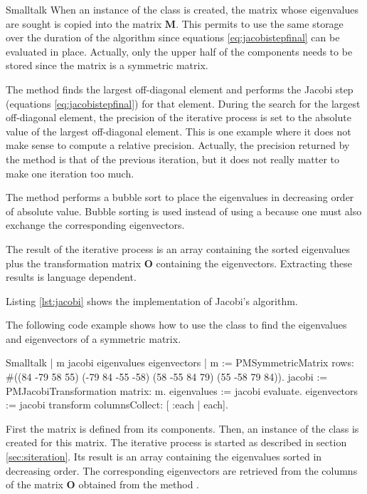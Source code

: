\begin{displaycode}{Smalltalk}
When an instance of the class  is created,
the matrix whose eigenvalues are sought is copied into the matrix
$\textbf{M}$.
This permits to use the same storage over the duration of the algorithm since equations \ref{eq:jacobistepfinal} can be evaluated in place.
Actually, only the upper half of the components needs to be stored since the matrix is a symmetric
matrix.

The method  finds the largest off-diagonal
element and performs the Jacobi step (equations
\ref{eq:jacobistepfinal}) for that element. During the search for
the largest off-diagonal element, the precision of the iterative
process is set to the absolute value of the largest off-diagonal
element. This is one example where it does not make sense to
compute a relative precision. Actually, the precision returned by
the method  is that of the previous
iteration, but it does not really matter to make one iteration too
much.

The method  performs a bubble sort to
place the eigenvalues in decreasing order of absolute value.
Bubble sorting is used instead of using a 
because one must also exchange the corresponding eigenvectors.

The result of the iterative process is an array containing the
sorted eigenvalues plus the transformation matrix $\textbf{O}$
containing the eigenvectors. Extracting these results is language
dependent.

Listing \ref{lst:jacobi} shows the implementation of Jacobi's algorithm.

The following code example shows how to use the class to find the
eigenvalues and eigenvectors of a symmetric matrix.
\begin{displaycode}{Smalltalk}
 | m jacobi eigenvalues eigenvectors |
 m := PMSymmetricMatrix rows: #((84 -79 58 55)
                                 (-79 84 -55 -58)
                                 (58 -55 84 79)
                                 (55 -58 79 84)).
 jacobi := PMJacobiTransformation matrix: m.
 eigenvalues := jacobi evaluate.
 eigenvectors := jacobi transform columnsCollect: [ :each | each].
\end{displaycode}
First the matrix  is defined from its components. Then, an
instance of the class  is created for
this matrix. The iterative process is started as described in
section \ref{sec:siteration}. Its result is an array containing
the eigenvalues sorted in decreasing order. The corresponding
eigenvectors are retrieved from the columns of the matrix $\textbf{O}$ obtained from the method .


\end{displaycode}
